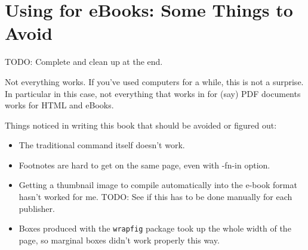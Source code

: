 \chapter{Using \latex for eBooks: Some Things to Avoid}

TODO: Complete and clean up at the end.

Not everything works. If you've used computers for a while, this is not a surprise. In particular in this case,
not everything that works in \latex for (say) PDF documents works for HTML and eBooks.

Things noticed in writing this book that should be avoided or figured out:

\begin{itemize}
    \item The traditional \latex command itself doesn't work.
    \item Footnotes are hard to get on the same page, even with -fn-in option.
    \item Getting a thumbnail image to compile automatically into the e-book format hasn't worked for me.
      TODO: See if this has to be done manually for each publisher.
    \item Boxes produced with the \texttt{wrapfig} package took up the whole width of the page, so marginal boxes didn't work properly this way. 
\end{itemize}



